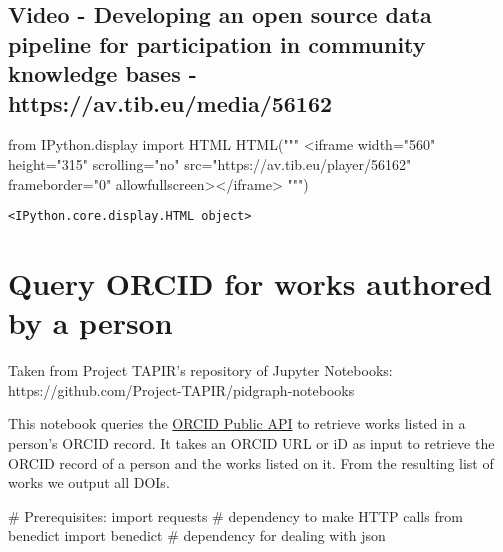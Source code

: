 \documentclass[
  letterpaper,
  DIV=11,
  numbers=noendperiod]{scrreprt}
\newenvironment{Shaded}{\begin{snugshade}}{\end{snugshade}}
\newcommand{\CommentTok}[1]{\textcolor[rgb]{0.37,0.37,0.37}{#1}}
\newcommand{\ImportTok}[1]{\textcolor[rgb]{0.00,0.46,0.62}{#1}}
\newcommand{\NormalTok}[1]{\textcolor[rgb]{0.00,0.23,0.31}{#1}}
\newcommand{\StringTok}[1]{\textcolor[rgb]{0.13,0.47,0.30}{#1}}
\begin{document}
\hypertarget{video---developing-an-open-source-data-pipeline-for-participation-in-community-knowledge-bases---httpsav.tib.eumedia56162}{%
\section{Video - Developing an open source data pipeline for
participation in community knowledge bases -
https://av.tib.eu/media/56162}\label{video---developing-an-open-source-data-pipeline-for-participation-in-community-knowledge-bases---httpsav.tib.eumedia56162}}

\begin{Shaded}
\begin{Highlighting}[]
\ImportTok{from}\NormalTok{ IPython.display }\ImportTok{import}\NormalTok{ HTML}
\NormalTok{HTML(}\StringTok{"""}
\StringTok{\textless{}iframe width="560" height="315" scrolling="no" src="https://av.tib.eu/player/56162" frameborder="0" allowfullscreen\textgreater{}\textless{}/iframe\textgreater{}}
\StringTok{"""}\NormalTok{)}
\end{Highlighting}
\end{Shaded}

\begin{verbatim}
<IPython.core.display.HTML object>
\end{verbatim}


\hypertarget{query-orcid-for-works-authored-by-a-person}{%
\chapter{Query ORCID for works authored by a
person}\label{query-orcid-for-works-authored-by-a-person}}

Taken from Project TAPIR's repository of Jupyter Notebooks:
https://github.com/Project-TAPIR/pidgraph-notebooks

This notebook queries the \href{https://pub.orcid.org/v3.0/}{ORCID
Public API} to retrieve works listed in a person's ORCID record. It
takes an ORCID URL or iD as input to retrieve the ORCID record of a
person and the works listed on it. From the resulting list of works we
output all DOIs.

\begin{Shaded}
\begin{Highlighting}[]
\CommentTok{\# Prerequisites:}
\ImportTok{import}\NormalTok{ requests                        }\CommentTok{\# dependency to make HTTP calls}
\ImportTok{from}\NormalTok{ benedict }\ImportTok{import}\NormalTok{ benedict          }\CommentTok{\# dependency for dealing with json}
\end{Highlighting}
\end{Shaded}
\end{document}
